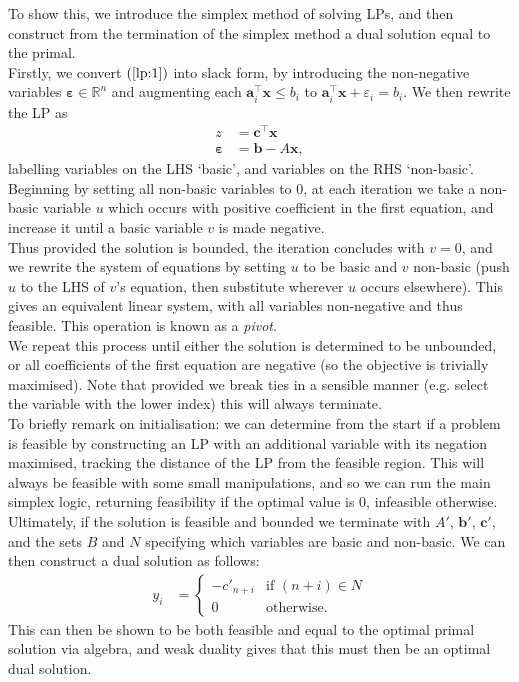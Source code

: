 \documentclass{tikzposter} %
\begin{document}
\begin{columns}
{    To show this, we introduce the simplex method of solving LPs, and then construct from the termination of the simplex method a dual solution equal to the primal. \\

    Firstly, we convert $(\ref{lp:1})$ into slack form, by introducing the non-negative variables $\bm{\varepsilon} \in \mathbb{R}^{n}$ and augmenting each $\bm{a}^{\top}_{i}\bm{x} \le b_{i}$ to $\bm{a}^{\top}_{i}\bm{x} + \varepsilon_{i} = b_{i}$. We then rewrite the LP as
    \begin{align*}
      z &= \bm{c}^{\top}\bm{x} \\
      \bm{\varepsilon} &= \bm{b} - A\bm{x},
    \end{align*}
    labelling variables on the LHS `basic', and variables on the RHS `non-basic'. Beginning by setting all non-basic variables to $0$, at each iteration we take a non-basic variable $u$ which occurs with positive coefficient in the first equation, and increase it until a basic variable $v$ is made negative. \\

    Thus provided the solution is bounded, the iteration concludes with $v = 0$, and we rewrite the system of equations by setting $u$ to be basic and $v$ non-basic (push $u$ to the LHS of $v$'s equation, then substitute wherever $u$ occurs elsewhere). This gives an equivalent linear system, with all variables non-negative and thus feasible. This operation is known as a \emph{pivot}.\\

    We repeat this process until either the solution is determined to be unbounded, or all coefficients of the first equation are negative (so the objective is trivially maximised). Note that provided we break ties in a sensible manner (e.g. select the variable with the lower index) this will always terminate. \\

    To briefly remark on initialisation: we can determine from the start if a problem is feasible by constructing an LP with an additional variable with its negation maximised, tracking the distance of the LP from the feasible region. This will always be feasible with some small manipulations, and so we can run the main simplex logic, returning feasibility if the optimal value is $0$, infeasible otherwise. \\

    Ultimately, if the solution is feasible and bounded we terminate with $A'$, $\bm{b}'$, $\bm{c}'$, and the sets $B$ and $N$ specifying which variables are basic and non-basic. We can then construct a dual solution as follows:
    \begin{align*}
      y_{i} &= \begin{cases}
        -c'_{n+i} & \text{if $(n+i) \in N$} \\
        0 & \text{otherwise}.
     \end{cases}
    \end{align*}
    This can then be shown to be both feasible and equal to the optimal primal solution via algebra, and weak duality gives that this must then be an optimal dual solution. \\

}
\end{columns}
\end{document}
